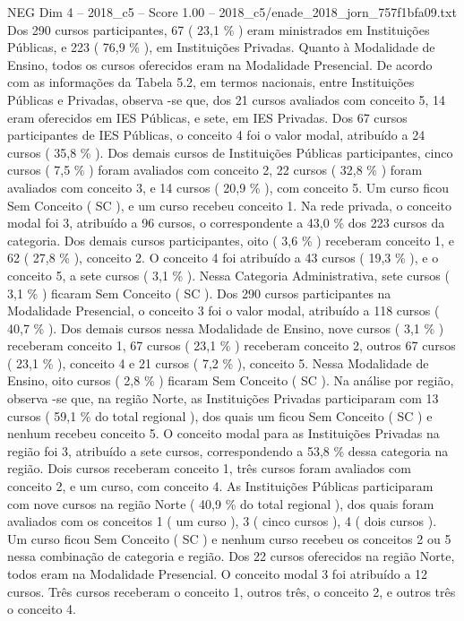 \begin{textsample}{NEG Dim 4 – 2018\_c5 – Score 1.00 – 2018\_c5/enade\_2018\_jorn\_757f1bfa09.txt}
Dos 290 cursos participantes, 67 ( 23,1 \% ) eram ministrados em Instituições Públicas, e 223 ( 76,9 \% ), em Instituições Privadas.
Quanto à Modalidade de Ensino, todos os cursos oferecidos eram na Modalidade Presencial.
De acordo com as informações da Tabela 5.2, em termos nacionais, entre Instituições Públicas e Privadas, observa -se que, dos 21 cursos avaliados com conceito 5, 14 eram oferecidos em IES Públicas, e sete, em IES Privadas.
Dos 67 cursos participantes de IES Públicas, o conceito 4 foi o valor modal, atribuído a 24 cursos ( 35,8 \% ).
Dos demais cursos de Instituições Públicas participantes, cinco cursos ( 7,5 \% ) foram avaliados com conceito 2, 22 cursos ( 32,8 \% ) foram avaliados com conceito 3, e 14 cursos ( 20,9 \% ), com conceito 5.
Um curso ficou Sem Conceito ( SC ), e um curso recebeu conceito 1.
Na rede privada, o conceito modal foi 3, atribuído a 96 cursos, o correspondente a 43,0 \% dos 223 cursos da categoria.
Dos demais cursos participantes, oito ( 3,6 \% ) receberam conceito 1, e 62 ( 27,8 \% ), conceito 2.
O conceito 4 foi atribuído a 43 cursos ( 19,3 \% ), e o conceito 5, a sete cursos ( 3,1 \% ).
Nessa Categoria Administrativa, sete cursos ( 3,1 \% ) ficaram Sem Conceito ( SC ).
Dos 290 cursos participantes na Modalidade Presencial, o conceito 3 foi o valor modal, atribuído a 118 cursos ( 40,7 \% ).
Dos demais cursos nessa Modalidade de Ensino, nove cursos ( 3,1 \% ) receberam conceito 1, 67 cursos ( 23,1 \% ) receberam conceito 2, outros 67 cursos ( 23,1 \% ), conceito 4 e 21 cursos ( 7,2 \% ), conceito 5.
Nessa Modalidade de Ensino, oito cursos ( 2,8 \% ) ficaram Sem Conceito ( SC ).
Na análise por região, observa -se que, na região Norte, as Instituições Privadas participaram com 13 cursos ( 59,1 \% do total regional ), dos quais um ficou Sem Conceito ( SC ) e nenhum recebeu conceito 5.
O conceito modal para as Instituições Privadas na região foi 3, atribuído a sete cursos, correspondendo a 53,8 \% dessa categoria na região.
Dois cursos receberam conceito 1, três cursos foram avaliados com conceito 2, e um curso, com conceito 4.
As Instituições Públicas participaram com nove cursos na região Norte ( 40,9 \% do total regional ), dos quais foram avaliados com os conceitos 1 ( um curso ), 3 ( cinco cursos ), 4 ( dois cursos ).
Um curso ficou Sem Conceito ( SC ) e nenhum curso recebeu os conceitos 2 ou 5 nessa combinação de categoria e região.
Dos 22 cursos oferecidos na região Norte, todos eram na Modalidade Presencial.
O conceito modal 3 foi atribuído a 12 cursos.
Três cursos receberam o conceito 1, outros três, o conceito 2, e outros três o conceito 4.

\end{textsample}
